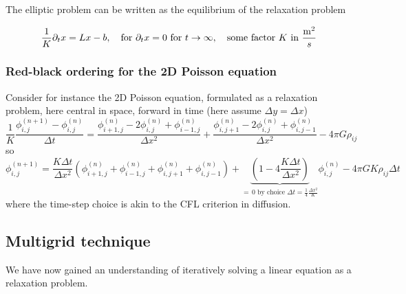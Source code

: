 The elliptic problem can be written as the equilibrium of the relaxation problem

\begin{equation}
    \frac{1}{K} \partial_t x = L x - b, \quad \text{for } \partial_t x = 0 \text{ for } t \rightarrow \infty, \quad \text{some factor } K \text{ in } \frac{\operatorname{m}^2}{s}
\end{equation}

\subsubsection{Red-black ordering for the 2D Poisson equation}
Consider for instance the 2D Poisson equation, formulated as a relaxation problem, here central in space,
forward in time (here assume $\Delta y = \Delta x$)
\begin{equation}
    \frac{1}{K} \frac{\phi_{i, j}^{(n+1)}-\phi_{i, j}^{(n)}}{\Delta t}=\frac{\phi_{i+1, j}^{(n)}-2 \phi_{i, j}^{(n)}+\phi_{i-1, j}^{(n)}}{\Delta x^2}+\frac{\phi_{i, j+1}^{(n)}-2 \phi_{i, j}^{(n)}+\phi_{i, j-1}^{(n)}}{\Delta x^2}-4 \pi G \rho_{i j}
\end{equation}
so
\begin{equation}
    \label{eq:2dpoisson_disc}
    \phi_{i, j}^{(n+1)}=\frac{K \Delta t}{\Delta x^2}\left(\phi_{i+1, j}^{(n)}+\phi_{i-1, j}^{(n)}+\phi_{i, j+1}^{(n)}+\phi_{i, j-1}^{(n)}\right)+\underbrace{\left(1-4 \frac{K \Delta t}{\Delta x^2}\right)}_{= \, 0 \text{ by choice } \Delta t = \frac{1}{4} \frac{\Delta x^2}{K}} \phi_{i, j}^{(n)}-4 \pi G K \rho_{i j} \Delta t
\end{equation}
where the time-step choice is akin to the CFL criterion in diffusion.

\subsection{Multigrid technique}
We have now gained an understanding of iteratively
solving a linear equation as a relaxation problem.


